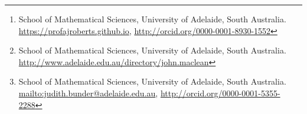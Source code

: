


\author{A.~J.~Roberts%
\thanks{School of Mathematical Sciences, University of Adelaide, South Australia.
\url{https://profajroberts.github.io},
\url{http://orcid.org/0000-0001-8930-1552}}
%
\and John~Maclean%
\thanks{School of Mathematical Sciences, University of Adelaide, South Australia.
\url{http://www.adelaide.edu.au/directory/john.maclean}}
%
\and J.~E.~Bunder%
\thanks{School of Mathematical Sciences, University of Adelaide, South Australia.
\protect\url{mailto:judith.bunder@adelaide.edu.au},
\protect\url{http://orcid.org/0000-0001-5355-2288}}
%
}

\date{\today}

\renewcommand{\and}{\hspace{2em plus 1em minus 1em}}

\setcounter{secnumdepth}{3}
\usepackage[T1]{fontenc}
\usepackage[dvipsnames]{xcolor}


\usepackage{pgfplots} 
\pgfplotsset{compat=newest} %
\usetikzlibrary{decorations.markings}
\usetikzlibrary{shapes,arrows,fit}
\usetikzlibrary{positioning}

\def\figurename{\em Figure}

\usepackage{fancyvrb}
\newenvironment{matlab}%
    {\Verbatim[numbers=left,firstnumber=\the\inputlineno]}%
    {\endVerbatim}
\makeatletter
\def\fancyvrbStartStop{%
  \edef\FancyVerbStartString{\@percentchar\@charrb} 
  \edef\FancyVerbStopString{\@percentchar\@charlb} }
\makeatother


\usepackage{natbib}

\AtBeginDocument{\let\harvardurl\url}

\usepackage{versions}
\newenvironment{devMan}{}{} %
\newenvironment{userMan}{}{} %

\usepackage[leftcaption]{sidecap}
\usepackage{url,microtype,amsmath,amssymb,defns,graphicx,hyperref,doi}
\hypersetup{colorlinks
    ,linkcolor=RoyalBlue,citecolor=RoyalBlue,pagecolor=RoyalBlue%
    ,urlcolor=magenta,filecolor=magenta,breaklinks%
    ,dvips,bookmarks,bookmarksopen}
\makeatletter
\AtBeginDocument{{\def\and{, }\def\thanks#1{}%
  \hypersetup{
    pdfauthor={\@author},
    pdftitle={\@title}}}
    }
\makeatother
\usepackage[capitalise,nameinlink,noabbrev]{cleveref}

